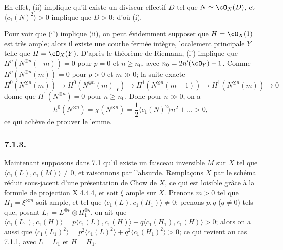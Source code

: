 En effet, (ii) implique qu'il existe un diviseur effectif $D$ tel que $N \simeq \cO_X(D)$, et $\langle c_1(N)^2 \rangle > 0$ implique que $D > 0$; d'o\`u (i).

Pour voir que (i') implique (ii), on peut \'evidemment supposer que $H = \cO_X(1)$ est tr\`es ample; alors il existe une courbe ferm\'ee int\`egre, localement principale $Y$ telle que $H = \cO_X(Y)$. D'apr\`es le th\'eor\`eme de Riemann, (i') implique que $H^p(N^{\otimes n}(-m)) = 0$ pour $p = 0$ et $n \geq n_0$, avec $n_0 = 2n'(\cO_Y) - 1$. Comme $H^p(N^{\otimes n}(m)) = 0$ pour $p > 0$ et $m \gg 0$; la suite exacte
\[
H^0(N^{\otimes n}(m)) \to H^0(N^{\otimes n}(m)|_Y) \to H^1(N^{\otimes n}(m-1)) \to H^1(N^{\otimes n}(m)) \to 0
\]
donne que $H^1(N^{\otimes n}) = 0$ pour $n \geq n_0$. Donc pour $n \gg 0$, on a
\[
h^0(N^{\otimes n}) = \chi(N^{\otimes n}) = \frac{1}{2}\langle c_1(N)^2 \rangle n^2 + \dots > 0,
\]
ce qui ach\`eve de prouver le lemme.

\subsubsection*{7.1.3.}
Maintenant supposons dans 7.1 qu'il existe un faisceau inversible $M$ sur $X$ tel que $\langle c_1(L), c_1(M) \rangle \neq 0$, et raisonnons par l'absurde. Rempla\c{c}ons $X$ par le sch\'ema r\'eduit sous-jacent d'une pr\'esentation de Chow de $X$, ce qui est loisible gr\^ace \`a la formule de projection X 4.4.4, et soit $\xi$ ample sur $X$. Prenons $m > 0$ tel que $H_1 = \xi^{\otimes m}$ soit ample, et tel que $\langle c_1(L), c_1(H_1) \rangle \neq 0$; prenons $p, q$ ($q \neq 0$) tels que, posant $L_1 = L^{\otimes p} \otimes H_1^{\otimes q}$, on ait que $\langle c_1(L_1), c_1(H) \rangle = p\langle c_1(L), c_1(H) \rangle + q\langle c_1(H_1), c_1(H) \rangle > 0$; alors on a aussi que $\langle c_1(L_1)^2 \rangle = p^2\langle c_1(L)^2 \rangle + q^2\langle c_1(H_1)^2 \rangle > 0$; ce qui revient au cas 7.1.1, avec $L = L_1$ et $H = H_1$.

